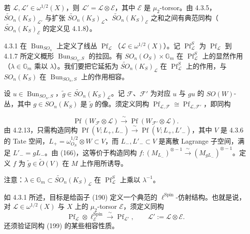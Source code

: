 若 $\mathcal{L},\mathcal{L}'\in\omega^{1/2}(X)$，则 $\mathcal{L}'=\mathcal{L}\otimes\mathcal{E}$，其中 $\mathcal{E}$ 是 $\mu_{2}$-torsor。由 4.3.5，$\tilde{SO}_{n}(K_{S})_{\mathcal{L}'}$ 与扩张 $\tilde{SO}_{n}(K_{S})_{\mathcal{L}}$、$\tilde{SO}_{n}(K_{S})_{\mathcal{E}}$ 之和之间有典范同构（$\tilde{SO}_{n}(K_{S})_{\mathcal{E}}$ 的定义见 4.1.8）。

 4.3.1 在 $\operatorname{Bun}_{SO_{n}}$ 上定义了线丛 $\operatorname{Pf}_{\mathcal{L}}$（$\mathcal{L}\in\omega^{1/2}(X)$）。记 $\operatorname{Pf}_{\mathcal{L}}^{S}$ 为 $\operatorname{Pf}_{\mathcal{L}}$ 到 4.1.7 所定义概形 $\operatorname{Bun}_{SO_{n},S}$ 的拉回。有 $SO_{n}(O_{S})\times\mathbb{G}_{m}$ 在 $\operatorname{Pf}_{\mathcal{L}}^{S}$ 上的显然作用（$\lambda\in\mathbb{G}_{m}$ 乘以 $\lambda$）。我们要把它延拓为 $\tilde{SO}_{n}(K_{S})_{\mathcal{L}}$ 在 $\operatorname{Pf}_{\mathcal{L}}^{S}$ 上的作用，与 $SO_{n}(K_{S})$ 在 $\operatorname{Bun}_{SO_{n},S}$ 上的作用相容。

设 $u\in\operatorname{Bun}_{SO_{n},S}$，$\tilde{g}\in\tilde{SO}_{n}(K_{S})_{\mathcal{L}}$。记 $\mathcal{F}$、$\mathcal{F}'$ 为对应 $u$ 与 $gu$ 的 $SO(W)$-丛，其中 $g\in SO_{n}(K_{S})$ 是 $\tilde{g}$ 的像。须定义同构 $\operatorname{Pf}_{\mathcal{L},\mathcal{F}}\cong\operatorname{Pf}_{\mathcal{L},\mathcal{F}'}$，即同构

\[
\operatorname{Pf}(W_{\mathcal{F}}\otimes\mathcal{L})\xrightarrow{\ \sim\ }\operatorname{Pf}(W_{\mathcal{F}'}\otimes\mathcal{L}).
\]
由 4.2.13，只需构造同构 $\operatorname{Pf}(V;L_{+},L_{-})\xrightarrow{\ \sim\ }\operatorname{Pf}(V;L_{+},L'_{-})$，其中 $V$ 是 4.3.6 的 Tate 空间，$L_{+}=\omega_{O_{S}}^{1/2}\otimes W\subset V$，而 $L_{-},L'_{-}\subset V$ 是离散 Lagrange 子空间，满足 $L'_{-}=gL_{-}$。由 (166)，这等价于构造同构 $f:(M_{L_{-}})^{\otimes-1}\xrightarrow{\ \sim\ }(M_{gL_{-}})^{\otimes-1}$。定义 $f$ 为 $\tilde{g}\in\tilde{O}(V)$ 在 $M$ 上作用所诱导。

注意：$\lambda\in\mathbb{G}_{m}\subset\tilde{SO}_{n}(K_{S})_{\mathcal{L}}$ 在 $\operatorname{Pf}_{\mathcal{L}}^{S}$ 上乘以 $\lambda^{-1}$。

 如 4.3.1 所述，目标是给函子 (190) 定义一个典范的 $\ell^{\operatorname{Spin}}$-仿射结构。也就是说，对 $\mathcal{L}\in\omega^{1/2}(X)$ 与 $X$ 上的 $\mu_{2}$-torsor $\mathcal{E}$，须定义同构
\begin{equation}\tag{199}
\operatorname{Pf}_{\mathcal{L}}\otimes\ell^{\operatorname{Spin}}_{\mathcal{E}}\xrightarrow{\ \sim\ }\operatorname{Pf}_{\mathcal{L}'},\qquad \mathcal{L}':=\mathcal{L}\otimes\mathcal{E}.
\end{equation}
还须验证同构 (199) 的某些相容性质。

